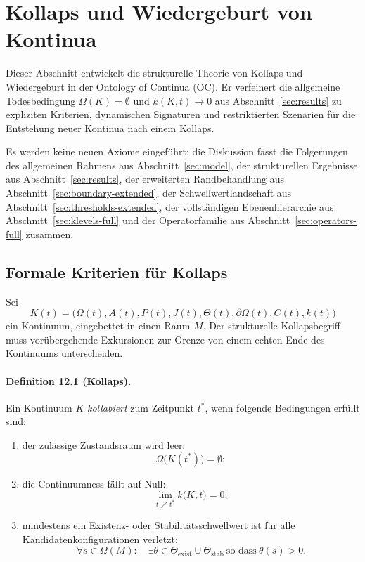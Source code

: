 
\section{Kollaps und Wiedergeburt von Kontinua}
\label{sec:collapse-rebirth}

Dieser Abschnitt entwickelt die strukturelle Theorie von Kollaps und
Wiedergeburt in der Ontology of Continua (OC). Er verfeinert die allgemeine
Todesbedingung \(\Omega(K)=\emptyset\) und \(k(K,t)\to 0\) aus
Abschnitt~\ref{sec:results} zu expliziten Kriterien, dynamischen Signaturen und
restriktierten Szenarien für die Entstehung neuer Kontinua nach einem Kollaps.

Es werden keine neuen Axiome eingeführt; die Diskussion fasst die
Folgerungen des allgemeinen Rahmens aus Abschnitt~\ref{sec:model}, der
strukturellen Ergebnisse aus Abschnitt~\ref{sec:results}, der erweiterten
Randbehandlung aus Abschnitt~\ref{sec:boundary-extended}, der
Schwellwertlandschaft aus Abschnitt~\ref{sec:thresholds-extended}, der
vollständigen Ebenenhierarchie aus Abschnitt~\ref{sec:klevels-full} und der
Operatorfamilie aus Abschnitt~\ref{sec:operators-full} zusammen.

\subsection{Formale Kriterien für Kollaps}

Sei
\[
  K(t) =
  \big(
    \Omega(t), A(t), P(t), J(t),
    \Theta(t), \partial\Omega(t), C(t), k(t)
  \big)
\]
ein Kontinuum, eingebettet in einen Raum \(M\). Der strukturelle Kollapsbegriff
muss vorübergehende Exkursionen zur Grenze von einem echten Ende des
Kontinuums unterscheiden.

\paragraph{Definition 12.1 (Kollaps).}
Ein Kontinuum \(K\) \emph{kollabiert} zum Zeitpunkt \(t^{\ast}\), wenn folgende
Bedingungen erfüllt sind:
\begin{enumerate}
  \item der zulässige Zustandsraum wird leer:
        \[
          \Omega\big(K(t^{\ast})\big) = \emptyset;
        \]
  \item die Continuumness fällt auf Null:
        \[
          \lim_{t \nearrow t^{\ast}} k\big(K,t\big) = 0;
        \]
  \item mindestens ein Existenz- oder Stabilitätsschwellwert ist für alle
        Kandidatenkonfigurationen verletzt:
        \[
          \forall s \in \Omega(M):
          \quad
          \exists \theta \in \Theta_{\mathrm{exist}} \cup \Theta_{\mathrm{stab}}
          \ \text{so dass}\ \theta(s) > 0.
        \]
\end{enumerate}

